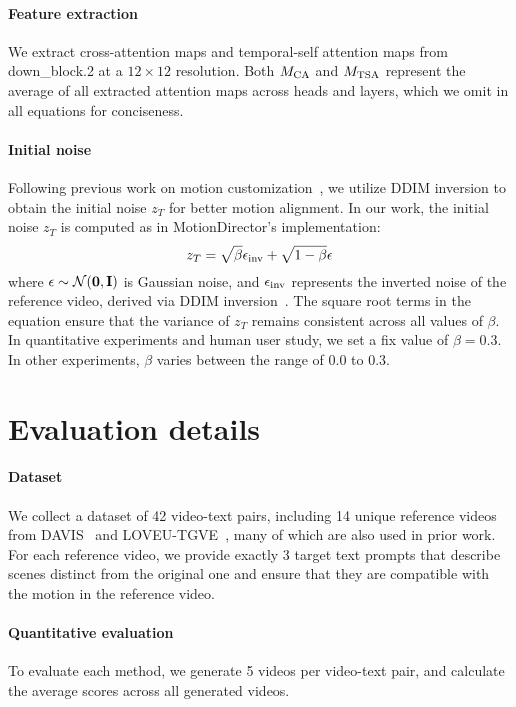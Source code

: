 \paragraph{Feature extraction}
We extract cross-attention maps and temporal-self attention maps from down\_block.2 at a $12\times 12$ resolution. Both $M_{{\rm CA}}$ and $M_{{\rm TSA}}$ represent the average of all extracted attention maps across heads and layers, which we omit in all equations for conciseness.

\paragraph{Initial noise}
\label{sec:noise}
Following previous work on motion customization~\cite{md, vmc, sma, dmt}, we utilize DDIM inversion to obtain the initial noise $z_T$ for better motion alignment. In our work, the initial noise $z_T$ is computed as in MotionDirector's implementation:
\begin{equation}
    z_T=\sqrt{\beta}\epsilon_{\rm inv}+\sqrt{1-\beta}\epsilon
  \label{eq:ddpm_in}
\end{equation}
where $\epsilon\sim\mathcal N(\bf{0},\bf{I})$ is Gaussian noise, and $\epsilon_{\rm inv}$ represents the inverted noise of the reference video, derived via DDIM inversion~\cite{ddim}. The square root terms in the equation ensure that the variance of $z_T$ remains consistent across all values of $\beta$. In quantitative experiments and human user study, we set a fix value of $\beta=0.3$. In other experiments, $\beta$ varies between the range of $0.0$ to $0.3$.

\section{Evaluation details}

\paragraph{Dataset}
We collect a dataset of 42 video-text pairs, including 14 unique reference videos from DAVIS~\cite{davis} and LOVEU-TGVE~\cite{loveu}, many of which are also used in prior work. For each reference video, we provide exactly 3 target text prompts that describe scenes distinct from the original one and ensure that they are compatible with the motion in the reference video.

\paragraph{Quantitative evaluation}
To evaluate each method, we generate 5 videos per video-text pair, and calculate the average scores across all generated videos.

